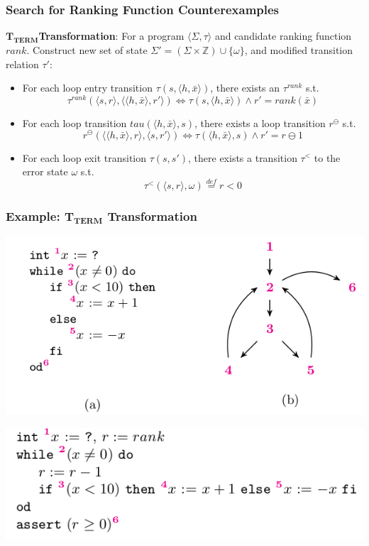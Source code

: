 \documentclass[11pt]{beamer}
\begin{document}
\begin{frame}\frametitle{Search for Ranking Function Counterexamples}
$\mathbf{T_{TERM}}$\textbf{Transformation}: For a program $\langle \Sigma, \tau\rangle $ and candidate ranking function $rank$. Construct new set of state $\Sigma' = (\Sigma \times \mathbb{Z}) \cup \{\omega\}$, and modified transition relation $\tau'$:
\begin{itemize}
\item  For each loop entry transition $\tau(s, \langle h, \bar{x} \rangle )$, there exists an $\tau^{rank}$ s.t.
\[\tau^{rank}(\langle s,r\rangle, \langle\langle h, \bar{x}\rangle, r' \rangle) \Leftrightarrow \tau(s, \langle h, \bar{x}\rangle) \wedge r' = rank(\bar{x})\]

\item For each loop transition $tau(\langle h, \bar{x} \rangle, s)$, there exists a loop transition $r^{\ominus}$ s.t.
\[r^{\ominus}(\langle\langle h, \bar{x}\rangle, r\rangle, \langle s, r'\rangle)\Leftrightarrow \tau(\langle h, \bar{x}\rangle, s) \wedge r' = r \ominus 1\]

\item For each loop exit transition $\tau(s, s')$, there exists a transition $\tau^{<}$ to the error state $\omega$ s.t.
\[\tau^{<}(\langle s,r\rangle, \omega) \stackrel{def}{=} r < 0\]
\end{itemize}


\end{frame}
\begin{frame}\frametitle{Example: $\mathbf{T_{TERM}}$ Transformation}

\begin{center}
\includegraphics[scale=0.4]{cfgloops.png}
\end{center}

\begin{center}
\includegraphics[scale=0.4]{tterm.png}
\end{center}

\end{frame}
\end{document}
